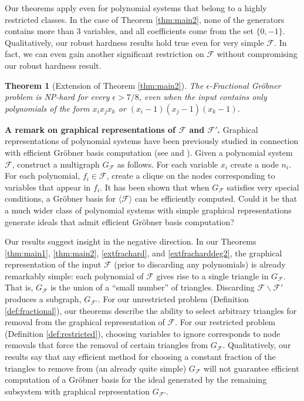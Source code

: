 \documentclass{article}
\newcommand{\F}[0]{\mathcal{F}}
\newcommand{\ep}[0]{\epsilon}
\newtheorem{thm}{Theorem}
\begin{document}
Our theorems apply even for polynomial systems that belong to a highly restricted classes.  In the case of Theorem \ref{thm:main2}, none of the generators contains more than 3 variables, and all coefficients come from the set $\{0,-1\}$. Qualitatively, our robust hardness results hold true even for very simple $\F$. In fact, we can even gain another significant restriction on $\F$ without compromising our robust hardness result.

\begin{thm}[Extension of Theorem \ref{thm:main2}] \label{thm:main3}
The $\ep$\nobreakdash-Fractional Gr\"{o}bner problem is NP-hard for every $\ep > 7/8$, even when the input contains only polynomials of the form $x_ix_jx_k$ or $(x_i-1)(x_j-1)(x_k-1)$.
\end{thm}



\noindent\textbf{A remark on graphical representations of $\F$ and $\F'$.}
Graphical representations of polynomial systems have been previously studied in connection with efficient Gr\"obner basis computation  (see \cite{parrilo} and \cite{deloera}). 
Given a polynomial system $\F$, construct a multigraph $G_{\F}$ as follows. For each variable $x_i$ create a node $n_i$. For each polynomial, $f_i\in \F$, create a clique on the nodes corresponding to variables that appear in $f_i$.
It has been shown that when $G_{\F}$ satisfies very special conditions, a Gr\"obner basis for $\langle\F\rangle$ can be efficiently computed. Could it be that a much wider class of polynomial systems with simple graphical representations generate ideals that admit efficient Gr\"obner basis computation? 

Our results suggest insight in the negative direction. In our Theorems \ref{thm:main1}, \ref{thm:main2}, \ref{extfrachard}, and \ref{extfracharddeg2}, the graphical representation of the input $\F$ (prior to discarding any polynomials) is already remarkably simple: each polynomial of $\F$ gives rise to a single triangle in $G_{\F}$. That is, $G_{\F}$ is the union of a ``small number'' of triangles.
Discarding $\F\backslash \F'$ produces a subgraph, $G_{\F'}$. For our unrestricted problem (Definition \ref{def:fractional}), our theorems describe the ability to select arbitrary triangles for removal from the graphical representation of $\F$. For our restricted problem (Definition \ref{def:restricted}), choosing variables to ignore corresponds to node removals that force the removal of certain triangles from $G_{\F}$. Qualitatively, our results say that any efficient method for choosing a constant fraction of the triangles to remove from (an already quite simple) $G_{\F}$ will not guarantee efficient computation of a Gr\"{o}bner basis for the ideal generated by the remaining subsystem with graphical representation $G_{\F'}$.\\
\end{document}
